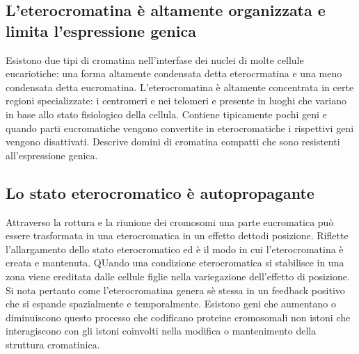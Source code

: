 \subsection{L'eterocromatina \`e altamente organizzata e limita l'espressione genica}
Esistono due tipi di cromatina nell'interfase dei nuclei di molte cellule eucariotiche: una forma altamente condensata detta eterocrmatina e una meno condensata detta eucromatina. 
L'eterocromatina \`e altamente concentrata in certe regioni specializzate: i centromeri e nei telomeri e presente in luoghi che variano in base allo stato fisiologico della cellula. 
Contiene tipicamente pochi geni e quando parti eucromatiche vengono convertite in eterocromatiche i rispettivi geni vengono disattivati. Descrive domini di cromatina compatti che sono
resistenti all'espressione genica.
\subsection{Lo stato eterocromatico \`e autopropagante}
Attraverso la rottura e la riunione dei cromosomi una parte eucromatica pu\`o essere trasformata in una eterocromatica in un effetto dettodi posizione. Riflette l'allargamento dello 
stato eterocromatico ed \`e il modo in cui l'eterocromatina \`e creata e mantenuta. QUando una condizione eterocromatica si stabilisce in una zona viene ereditata dalle cellule figlie
nella variegazione dell'effetto di posizione. Si nota pertanto come l'eterocromatina genera s\`e stessa in un feedback positivo che si espande spazialmente e temporalmente. Esistono 
geni che aumentano o diminuiscono questo processo che codificano proteine cromosomali non istoni che interagiscono con gli istoni coinvolti nella modifica o mantenimento della struttura
cromatinica.
